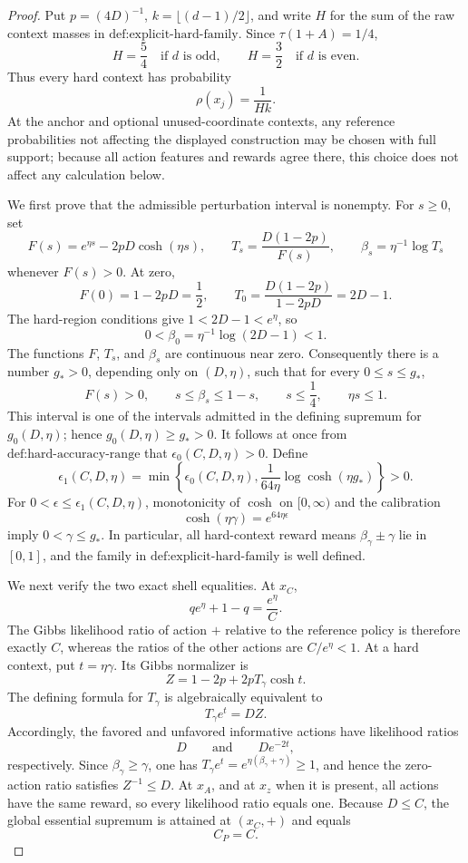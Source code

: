 \documentclass{article}
\begin{document}
\begin{proof}
Put \(p=(4D)^{-1}\), \(k=\lfloor(d-1)/2\rfloor\), and write \(H\) for the sum of the raw context masses in \(\text{def:explicit-hard-family}\). Since \(\tau(1+A)=1/4\),
\[
H=\frac54\quad\text{if \(d\) is odd},\qquad H=\frac32\quad\text{if \(d\) is even}.
\]
Thus every hard context has probability
\[
\rho(x_j)=\frac1{Hk}.
\]
At the anchor and optional unused-coordinate contexts, any reference probabilities not affecting the displayed construction may be chosen with full support; because all action features and rewards agree there, this choice does not affect any calculation below.

We first prove that the admissible perturbation interval is nonempty. For \(s\ge0\), set
\[
F(s)=e^{\eta s}-2pD\cosh(\eta s),\qquad
T_s=\frac{D(1-2p)}{F(s)},\qquad
\beta_s=\eta^{-1}\log T_s
\]
whenever \(F(s)>0\). At zero,
\[
F(0)=1-2pD=\frac12,\qquad
T_0=\frac{D(1-2p)}{1-2pD}=2D-1.
\]
The hard-region conditions give \(1<2D-1<e^\eta\), so
\[
0<\beta_0=\eta^{-1}\log(2D-1)<1.
\]
The functions \(F\), \(T_s\), and \(\beta_s\) are continuous near zero. Consequently there is a number \(g_*>0\), depending only on \((D,\eta)\), such that for every \(0\le s\le g_*\),
\[
F(s)>0,\qquad s\le\beta_s\le1-s,\qquad s\le\frac14,\qquad \eta s\le1.
\]
This interval is one of the intervals admitted in the defining supremum for \(g_0(D,\eta)\); hence \(g_0(D,\eta)\ge g_*>0\). It follows at once from \(\text{def:hard-accuracy-range}\) that \(\epsilon_0(C,D,\eta)>0\). Define
\[
\epsilon_1(C,D,\eta)
=
\min\left\{
\epsilon_0(C,D,\eta),
\frac1{64\eta}\log\cosh(\eta g_*)
\right\}>0.
\]
For \(0<\epsilon\le\epsilon_1(C,D,\eta)\), monotonicity of \(\cosh\) on \([0,\infty)\) and the calibration
\[
\cosh(\eta\gamma)=e^{64\eta\epsilon}
\]
imply \(0<\gamma\le g_*\). In particular, all hard-context reward means \(\beta_\gamma\pm\gamma\) lie in \([0,1]\), and the family in \(\text{def:explicit-hard-family}\) is well defined.

We next verify the two exact shell equalities. At \(x_C\),
\[
q e^\eta+1-q=\frac{e^\eta}{C}.
\]
The Gibbs likelihood ratio of action \(+\) relative to the reference policy is therefore exactly \(C\), whereas the ratios of the other actions are \(C/e^\eta<1\). At a hard context, put \(t=\eta\gamma\). Its Gibbs normalizer is
\[
Z=1-2p+2pT_\gamma\cosh t.
\]
The defining formula for \(T_\gamma\) is algebraically equivalent to
\[
T_\gamma e^t=DZ.
\]
Accordingly, the favored and unfavored informative actions have likelihood ratios
\[
D\qquad\text{and}\qquad De^{-2t},
\]
respectively. Since \(\beta_\gamma\ge\gamma\), one has \(T_\gamma e^t=e^{\eta(\beta_\gamma+\gamma)}\ge1\), and hence the zero-action ratio satisfies \(Z^{-1}\le D\). At \(x_A\), and at \(x_z\) when it is present, all actions have the same reward, so every likelihood ratio equals one. Because \(D\le C\), the global essential supremum is attained at \((x_C,+)\) and equals
\[
C_P=C.
\]


\end{proof}
\end{document}
